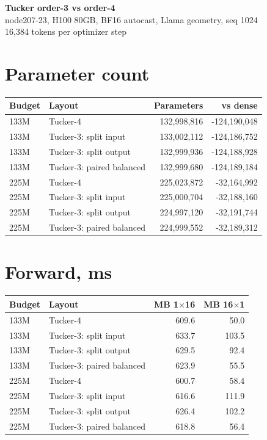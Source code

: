 \documentclass[10pt]{article}
\begin{document}
\begin{center}
{\LARGE\bfseries Tucker order-3 vs order-4}\\[3pt]
{\large node207-23, H100 80GB, BF16 autocast, Llama geometry, seq 1024}\\[2pt]
{16,384 tokens per optimizer step}
\end{center}
\section{Parameter count}
\begin{center}
\small
\begin{tabular}{llrr}
\toprule
\textbf{Budget} & \textbf{Layout} & \textbf{Parameters} & \textbf{vs dense} \\
\midrule
133M & Tucker-4 & 132,998,816 & -124,190,048 \\
133M & Tucker-3: split input & 133,002,112 & -124,186,752 \\
133M & Tucker-3: split output & 132,999,936 & -124,188,928 \\
133M & Tucker-3: paired balanced & 132,999,680 & -124,189,184 \\
225M & Tucker-4 & 225,023,872 & -32,164,992 \\
225M & Tucker-3: split input & 225,000,704 & -32,188,160 \\
225M & Tucker-3: split output & 224,997,120 & -32,191,744 \\
225M & Tucker-3: paired balanced & 224,999,552 & -32,189,312 \\
\bottomrule
\end{tabular}
\end{center}
\section{Forward, ms}
\begin{center}
\small
\begin{tabular}{llrr}
\toprule
\textbf{Budget} & \textbf{Layout} & \textbf{MB 1$\times$16} & \textbf{MB 16$\times$1} \\
\midrule
133M & Tucker-4 & 609.6 & 50.0 \\
133M & Tucker-3: split input & 633.7 & 103.5 \\
133M & Tucker-3: split output & 629.5 & 92.4 \\
133M & Tucker-3: paired balanced & 623.9 & 55.5 \\
225M & Tucker-4 & 600.7 & 58.4 \\
225M & Tucker-3: split input & 616.6 & 111.9 \\
225M & Tucker-3: split output & 626.4 & 102.2 \\
225M & Tucker-3: paired balanced & 618.8 & 56.4 \\
\bottomrule
\end{tabular}
\end{center}
\end{document}

